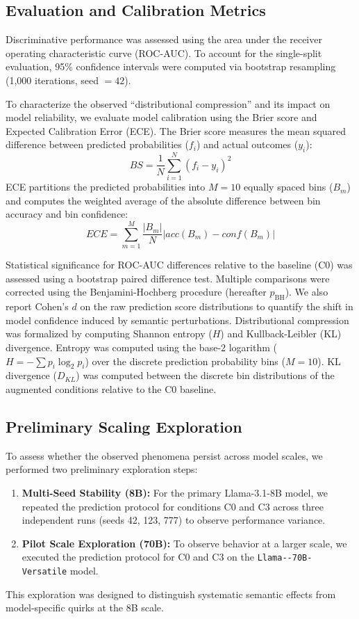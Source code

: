 \subsection{Evaluation and Calibration Metrics}
Discriminative performance was assessed using the area under the receiver operating characteristic curve (ROC-AUC). To account for the single-split evaluation, 95\% confidence intervals were computed via bootstrap resampling (1,000 iterations, seed $= 42$). 

To characterize the observed ``distributional compression'' and its impact on model reliability, we evaluate model calibration using the Brier score and Expected Calibration Error (ECE). The Brier score measures the mean squared difference between predicted probabilities ($f_i$) and actual outcomes ($y_i$):
\begin{equation}
BS = \frac{1}{N} \sum_{i=1}^{N} (f_i - y_i)^2
\end{equation}
ECE partitions the predicted probabilities into $M=10$ equally spaced bins ($B_m$) and computes the weighted average of the absolute difference between bin accuracy and bin confidence:
\begin{equation}
ECE = \sum_{m=1}^{M} \frac{|B_m|}{N} |acc(B_m) - conf(B_m)|
\end{equation}

Statistical significance for ROC-AUC differences relative to the baseline (C0) was assessed using a bootstrap paired difference test. Multiple comparisons were corrected using the Benjamini-Hochberg procedure (hereafter $p_{\text{BH}}$). We also report Cohen's $d$ on the raw prediction score distributions to quantify the shift in model confidence induced by semantic perturbations. Distributional compression was formalized by computing Shannon entropy ($H$) and Kullback-Leibler (KL) divergence. Entropy was computed using the base-2 logarithm ($H = -\sum p_i \log_2 p_i$) over the discrete prediction probability bins ($M=10$). KL divergence ($D_{KL}$) was computed between the discrete bin distributions of the augmented conditions relative to the C0 baseline.

\subsection{Preliminary Scaling Exploration}
\label{sec:implementation_robustness}
To assess whether the observed phenomena persist across model scales, we performed two preliminary exploration steps:
\begin{enumerate}
    \item \textbf{Multi-Seed Stability (8B):} For the primary Llama-3.1-8B model, we repeated the prediction protocol for conditions C0 and C3 across three independent runs (seeds 42, 123, 777) to observe performance variance.
    \item \textbf{Pilot Scale Exploration (70B):} To observe behavior at a larger scale, we executed the prediction protocol for C0 and C3 on the \texttt{Llama--\allowbreak 70B-\allowbreak Versatile} model.
\end{enumerate}
This exploration was designed to distinguish systematic semantic effects from model-specific quirks at the 8B scale.
